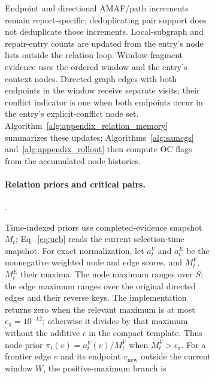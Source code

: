 \documentclass[11pt]{article}
\newcommand{\oc}{OC}
\begin{document}
\begin{figure}[!t]
\begin{figure}[!t]
\begin{revadded}
Endpoint and directional AMAF/path increments remain report-specific; deduplicating pair support does not deduplicate those increments. Local-subgraph and repair-entry counts are updated from the entry's node lists outside the relation loop. Window-fragment evidence uses the ordered window and the entry's context nodes. Directed graph edges with both endpoints in the window receive separate visits; their conflict indicator is one when both endpoints occur in the entry's explicit-conflict node set. Algorithm~\ref{alg:appendix_relation_memory} summarizes these updates; Algorithms~\ref{alg:samcgs} and~\ref{alg:appendix_rollout} then compute \oc{} flags from the accumulated node histories.
\end{revadded}

\paragraph{Relation priors and critical pairs.}
 \revreplace{\oc{} endpoint evidence}{\oc{} node flags}. 
\begin{revadded}
Time-indexed priors use completed-evidence snapshot $M_t$; Eq.~\ref{eq:ucb} reads the current selection-time snapshot. For exact normalization, let $a_t^V$ and $a_t^E$ be the nonnegative weighted node and edge scores, and $M_t^V$, $M_t^E$ their maxima. The node maximum ranges over $S$; the edge maximum ranges over the original directed edges and their reverse keys. The implementation returns zero when the relevant maximum is at most $\epsilon_\pi=10^{-12}$; otherwise it divides by that maximum without the additive $\epsilon$ in the compact template. Thus node prior $\pi_t(v)=a_t^V(v)/M_t^V$ when $M_t^V>\epsilon_\pi$. For a frontier edge $e$ and its endpoint $v_{\mathrm{new}}$ outside the current window $W$, the positive-maximum branch is
\[
\begin{aligned}

\end{aligned}\]
\end{revadded}
\end{figure}
\end{figure}
\end{document}
